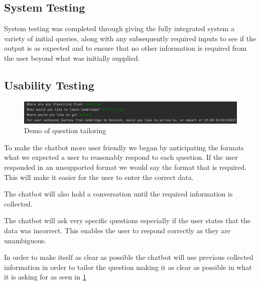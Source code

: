 \documentclass[11pt]{article}
\begin{document}
	\subsection{System Testing}
	
	System testing was completed through giving the fully integrated system a variety of initial queries, along with any subsequently required inputs to see if the output is as expected and to ensure that no other information is required from the user beyond what was initially supplied.
	
	\subsection{Usability Testing}
	
	\begin{figure}[!htb]
		\begin{center}
			\includegraphics{Resources/Screenshot 2022-01-28 at 15.23.51.png}
			\caption{Demo of question tailoring}
			\label{Img:Userbility}
		\end{center}
	\end{figure}

	To make the chatbot more user friendly we began by anticipating the formats what we expected a user to reasonably respond to each question. If the user responded in an unsupported format we would say the format that is required. This will make it easier for the user to enter the correct data.
	
	The chatbot will also hold a conversation until the required information is collected. 
	
	The chatbot will ask very specific questions especially if the user states that the data was incorrect. This enables the user to respond correctly as they are unambiguous.
	
	In order to make itself as clear as possible the chatbot will use previous collected information in order to tailor the question making it as clear as possible in what it is asking for as seen in \ref{Img:Userbility}
	
\end{document}
